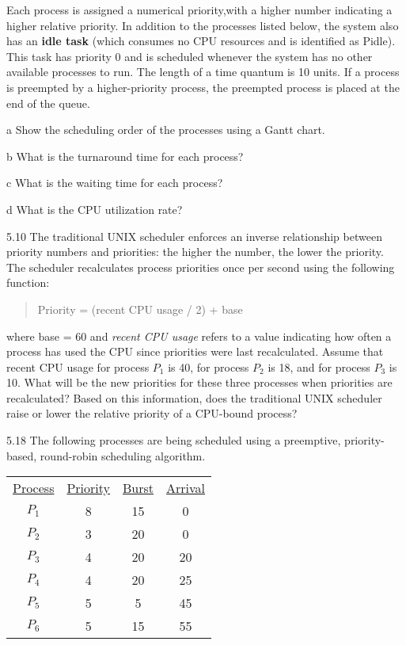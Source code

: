 \documentclass[12pt,a4paper]{article}
\newenvironment{problems}{\begin{list}{}{\renewcommand{\makelabel}[1]{\textbf{##1}\hfil}}}{\end{list}}
\newenvironment{steps}{\begin{list}{}{\renewcommand{\makelabel}[1]{##1.\hfil}}}{\end{list}}
\begin{document}
\begin{problems}
    Each process is assigned a numerical priority,with a higher number indicating
a higher relative priority. In addition to the processes listed below,
the system also has an \textbf{idle task} (which consumes no CPU resources and
is identified as Pidle). This task has priority 0 and is scheduled whenever
the system has no other available processes to run. The length of a time quantum is 10 units. If a process is preempted by a higher-priority
process, the preempted process is placed at the end of the queue.

\begin{steps}
    \item[a] Show the scheduling order of the processes using a Gantt chart.
    \item[b] What is the turnaround time for each process?
    \item[c]  What is the waiting time for each process?
    \item[d] What is the CPU utilization rate?
\end{steps}

\item[5.10] The traditional UNIX scheduler enforces an inverse relationship between
priority numbers and priorities: the higher the number, the lower the
priority. The scheduler recalculates process priorities once per second
using the following function:
\begin{quotation}
    Priority = (recent CPU usage / 2) + base
\end{quotation}
where base = 60 and \emph{recent CPU usage} refers to a value indicating how
often a process has used the CPU since priorities were last recalculated.
Assume that recent CPU usage for process $P_1$ is 40, for process $P_2$ is 18,
and for process $P_3$ is 10. What will be the new priorities for these three
processes when priorities are recalculated? Based on this information,
does the traditional UNIX scheduler raise or lower the relative priority
of a CPU-bound process?

\item[5.18] The following processes are being scheduled using a preemptive,
priority-based, round-robin scheduling algorithm.

\begin{tabular}{cccc}
    \underline{Process} & \underline{Priority} & \underline{Burst} &  \underline{Arrival}\\
$P_1$ & 8 & 15& 0\\
$P_2$ & 3 & 20& 0\\
$P_3$ & 4 & 20& 20\\
$P_4$ & 4 & 20& 25\\
$P_5$ & 5 & 5 &45\\
$P_6$ & 5 & 15& 55
\end{tabular}


\end{problems}
\end{document}
